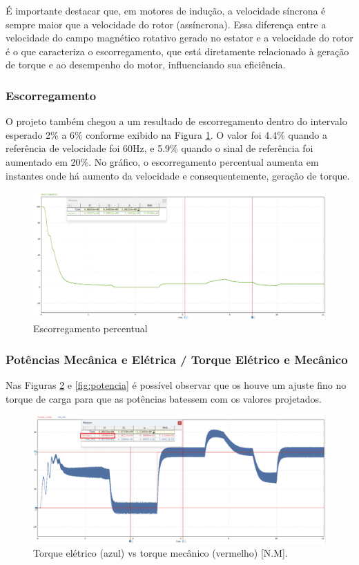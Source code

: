 \documentclass[a4paper, 11pt]{article}
\begin{document}
É importante destacar que, em motores de indução, a velocidade síncrona é sempre maior que a velocidade do rotor (assíncrona). Essa diferença entre a velocidade do campo magnético rotativo gerado no estator e a velocidade do rotor é o que caracteriza o escorregamento, que está diretamente relacionado à geração de torque e ao desempenho do motor, influenciando sua eficiência.

\subsubsection{Escorregamento}

O projeto também chegou a um resultado de escorregamento dentro do intervalo esperado 2\% a 6\% conforme exibido na Figura \ref{escorrega}. O valor foi 4.4\% quando a referência de velocidade foi 60Hz, e 5.9\% quando o sinal de referência foi aumentado em 20\%. No gráfico, o escorregamento percentual aumenta em instantes onde há aumento da velocidade e consequentemente, geração de torque. 

\begin{figure}[H]
    \centering
    \includegraphics[width=1\linewidth]{correcao_images/corre_escorrega.png}
    \caption{Escorregamento percentual}
    \label{escorrega}
\end{figure}

\subsubsection{Potências Mecânica e Elétrica / Torque Elétrico e Mecânico }

Nas Figuras \ref{fig:torques} e \ref{fig:potencia} é possível observar que os houve um ajuste fino no torque de carga para que as potências batessem com os valores projetados.

\begin{figure}[H]
    \centering
    \includegraphics[width=1\linewidth]{correcao_images/corre_torque.png}
    \caption{Torque elétrico (azul) vs torque mecânico (vermelho) [N.M].}
    \label{fig:torques}
\end{figure}
\end{document}
